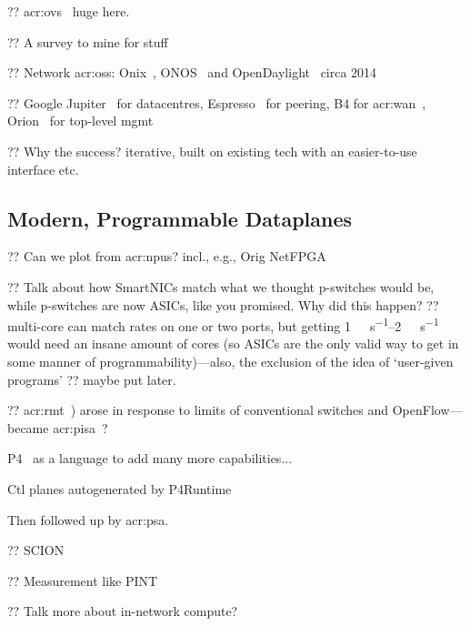 ?? \gls{acr:ovs}~\parencite{DBLP:conf/nsdi/PfaffPKJZRGWSSA15,DBLP:conf/sigcomm/TuWAP21} huge here.

?? A survey to mine for stuff~\parencite{DBLP:journals/comsur/NunesMNOT14}

?? Network \glspl{acr:os}: Onix~\parencite{DBLP:conf/osdi/KoponenCGSPZRIIHS10}, ONOS~\parencite{onos} and OpenDaylight~\parencite{opendaylight} circa 2014

?? Google Jupiter~\parencite{DBLP:conf/sigcomm/SinghOAAABBDFGK15} for datacentres, Espresso~\parencite{DBLP:conf/sigcomm/YapMRPHBHKNJLRR17} for peering, B4 for \gls{acr:wan}~\parencite{DBLP:conf/sigcomm/HongMAZABBJKLMP18}, Orion~\parencite{DBLP:conf/nsdi/FergusonGHKMMOP21} for top-level mgmt

?? Why the success? iterative, built on existing tech with an easier-to-use interface etc.

\subsection{Modern, Programmable Dataplanes}\label{sec:modern-pdps}
?? Can we plot from \glspl{acr:npu}? incl., e.g., Orig NetFPGA~\parencite{DBLP:conf/mse/LockwoodMWGHNRL07}

?? Talk about how SmartNICs match what we thought p-switches would be, while p-switches are now ASICs, like you promised. Why did this happen? ?? multi-core can match rates on one or two ports, but getting \qtyrange{1}{2}{\tera\bit\per\second} would need an insane amount of cores (so ASICs are the only valid way to get in some manner of programmability)---also, the exclusion of the idea of `user-given programs' ?? maybe put later.

?? \gls{acr:rmt}~\parencite{DBLP:conf/sigcomm/BosshartGKVMIMH13}) arose in response to limits of conventional switches and OpenFlow---became \gls{acr:pisa}~\parencite{barefoot-pisa}?

P4~\parencite{DBLP:journals/ccr/BosshartDGIMRSTVVW14} as a language to add many more capabilities...

Ctl planes autogenerated by P4Runtime~\parencite{p4-runtime}

Then followed up by  \gls{acr:psa}\parencite{p4-psa}.

?? SCION~\parencite{DBLP:conf/conext/RuiterS21}

?? Measurement like PINT~\parencite{DBLP:conf/sigcomm/BasatRLAYM20}

?? Talk more about in-network compute?

